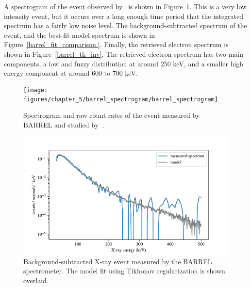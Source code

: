 A spectrogram of the event observed by~\citet{Halford2015} is shown in Figure~\ref{barrel_spectrogram}. This is a very low intensity event, but it occurs over a long enough time period that the integrated spectrum has a fairly low noise level. The background-subtracted spectrum of the event, and the best-fit model spectrum is shown in Figure~\ref{barrel_fit_comparison.}. Finally, the retrieved electron spectrum is shown in Figure~\ref{barrel_tk_inv}. The retrieved electron spectrum has two main components, a low and fuzzy distribution at around 250 keV, and a smaller high energy component at around 600 to 700 keV. 

\begin{figure}[p]
    \centering
    \texttt{[image: figures/chapter\_5/barrel\_spectrogram/barrel\_spectrogram]}
    \caption{Spectrogram and raw count rates of the event measured by BARREL and studied by~\citet{Halford2015}.}
    \label{barrel_spectrogram}
\end{figure}

\begin{figure}[p]
    \centering
    \includegraphics[width=1.0\textwidth]{figures/chapter_5/barrel_fit_comparison/barrel_fit_comparison}
    \caption{Background-subtracted X-ray event measured by the BARREL spectrometer. The model fit using Tikhonov regularization is shown overlaid.}
    \label{barrel_fit_comparison}
\end{figure}

